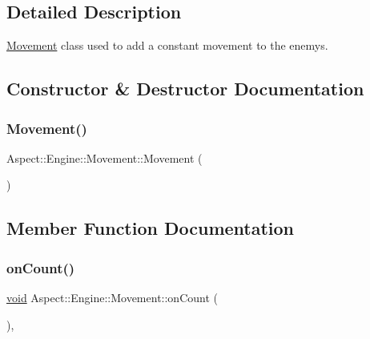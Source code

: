 \subsection{Detailed Description}
\mbox{\hyperlink{class_aspect_1_1_engine_1_1_movement}{Movement}} class used to add a constant movement to the enemys. 

\subsection{Constructor \& Destructor Documentation}
\mbox{\label{class_aspect_1_1_engine_1_1_movement_a34fbf2e93e913d47b7f27fa51f5c312e}} 
\subsubsection{\texorpdfstring{Movement()}{Movement()}}
{\footnotesize\ttfamily Aspect\+::\+Engine\+::\+Movement\+::\+Movement (\begin{DoxyParamCaption}{ }\end{DoxyParamCaption})}



\subsection{Member Function Documentation}
\mbox{\label{class_aspect_1_1_engine_1_1_movement_a4dc9ec0157d8d24dafeb69c3c3f60e23}} 
\subsubsection{\texorpdfstring{on\+Count()}{onCount()}}
{\footnotesize\ttfamily \mbox{\hyperlink{_s_d_l__opengles2__gl2ext_8h_ae5d8fa23ad07c48bb609509eae494c95}{void}} Aspect\+::\+Engine\+::\+Movement\+::on\+Count (\begin{DoxyParamCaption}{ }\end{DoxyParamCaption})\hspace{0.3cm}{\ttfamily [override]}, {\ttfamily [virtual]}}



